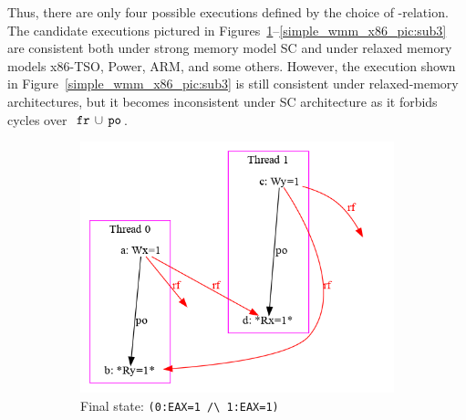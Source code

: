 Thus, there are only four possible executions defined by the choice of \rf-relation.
The candidate executions pictured in Figures~\ref{simple_wmm_x86_pic:sub1}--\ref{simple_wmm_x86_pic:sub3} are consistent both under strong memory model SC and under relaxed memory models x86-TSO, Power, ARM, and some others.
However, the execution shown in Figure~\ref{simple_wmm_x86_pic:sub3} is still consistent under relaxed-memory architectures, but it becomes inconsistent under SC architecture as it forbids cycles over~$\,\mathtt{fr}\,\cup\,\mathtt{po}\,$.

\begin{figure}[H]
\centering
\begin{subfigure}[t]{.28\textwidth}
  \centering
  \includegraphics[width=1.2\linewidth]{img/my/sb-example/SB-dot.png}
  \caption{Final state: \texttt{(0:EAX=1~/\textbackslash~1:EAX=1)}}
  \label{simple_wmm_x86_pic:sub1}
\end{subfigure}
\hfill
\begin{subfigure}[t]{.23\textwidth}
  \centering

\end{subfigure}
\end{figure}
